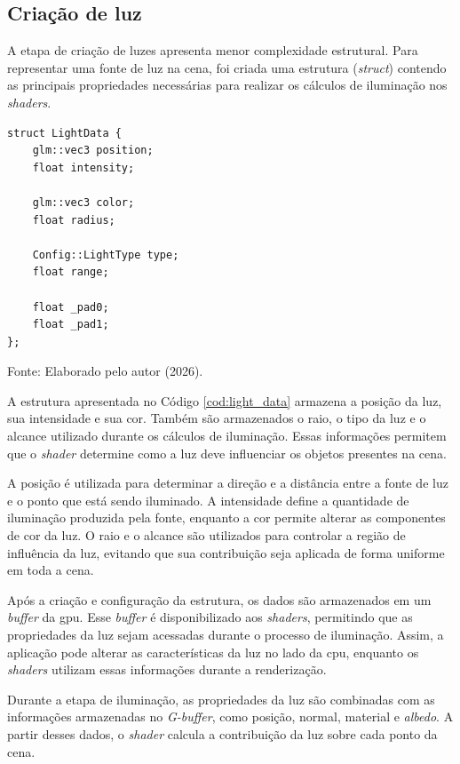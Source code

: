 \subsection{Criação de luz}

A etapa de criação de luzes apresenta menor complexidade estrutural. Para representar uma fonte de luz na cena, foi criada uma estrutura (\textit{struct}) contendo as principais propriedades necessárias para realizar os cálculos de iluminação nos \textit{shaders}.

\begin{lstlisting}[caption={\textit{Struct} com informações da luz}, label={cod:light_data}]
struct LightData {
    glm::vec3 position;
    float intensity;

    glm::vec3 color;
    float radius;

    Config::LightType type;
    float range;

    float _pad0;
    float _pad1;
};
\end{lstlisting}
{\normalsize
Fonte: Elaborado pelo autor (2026).
}

A estrutura apresentada no Código \ref{cod:light_data} armazena a posição da luz, sua intensidade e sua cor. Também são armazenados o raio, o tipo da luz e o alcance utilizado durante os cálculos de iluminação. Essas informações permitem que o \textit{shader} determine como a luz deve influenciar os objetos presentes na cena.

A posição é utilizada para determinar a direção e a distância entre a fonte de luz e o ponto que está sendo iluminado. A intensidade define a quantidade de iluminação produzida pela fonte, enquanto a cor permite alterar as componentes de cor da luz. O raio e o alcance são utilizados para controlar a região de influência da luz, evitando que sua contribuição seja aplicada de forma uniforme em toda a cena.

Após a criação e configuração da estrutura, os dados são armazenados em um \textit{buffer} da \gls{gpu}. Esse \textit{buffer} é disponibilizado aos \textit{shaders}, permitindo que as propriedades da luz sejam acessadas durante o processo de iluminação. Assim, a aplicação pode alterar as características da luz no lado da \gls{cpu}, enquanto os \textit{shaders} utilizam essas informações durante a renderização.

Durante a etapa de iluminação, as propriedades da luz são combinadas com as informações armazenadas no \textit{G-buffer}, como posição, normal, material e \textit{albedo}. A partir desses dados, o \textit{shader} calcula a contribuição da luz sobre cada ponto da cena.

